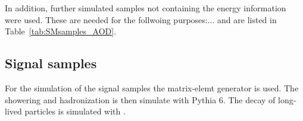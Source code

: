 In addition, further simulated samples not containing the energy information were used.
These are needed for the follwoing purposes:... and are listed in Table~\ref{tab:SMsamples_AOD}.
\renewcommand{\arraystretch}{1.5}
\begin{table}[!t]
\centering
\caption{Used Standard Model background samples without $\Delta E/\Delta x$ information.}
\label{tab:SMsamples_AOD}
\end{table}  


\subsection{Signal samples}
\label{sec:SignalSamples}

For the simulation of the signal samples the matrix-elemt generator \madgraph is used.
The showering and hadronization is then simulate with Pythia 6.
The decay of long-lived particles is simulated with \geant.


